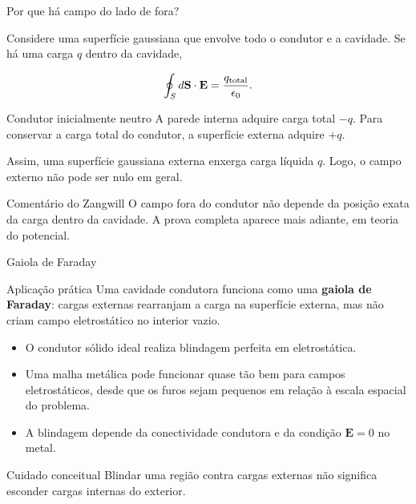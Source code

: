 \documentclass[aspectratio=169]{beamer}
\begin{document}
\begin{frame}{Por que há campo do lado de fora?}

\footnotesize

Considere uma superfície gaussiana que envolve todo o condutor e a cavidade.
Se há uma carga \(q\) dentro da cavidade,

\begin{eqbox}
\begin{equation}
\oint_S d\mathbf S\cdot \mathbf E
=
\frac{q_{\rm total}}{\epsilon_0}.
\label{eq:gauss-carga-cavidade}
\end{equation}
\end{eqbox}

\begin{mybox}{Condutor inicialmente neutro}
A parede interna adquire carga total \(-q\). Para conservar a carga total do
condutor, a superfície externa adquire \(+q\).
\end{mybox}

Assim, uma superfície gaussiana externa enxerga carga líquida \(q\). Logo,
o campo externo não pode ser nulo em geral.

\begin{alertblock}{Comentário do Zangwill}
O campo fora do condutor não depende da posição exata da carga dentro da
cavidade. A prova completa aparece mais adiante, em teoria do potencial.
\end{alertblock}

\end{frame}

\begin{frame}{Gaiola de Faraday}

\small

\begin{mybox}{Aplicação prática}
Uma cavidade condutora funciona como uma \textbf{gaiola de Faraday}: cargas
externas rearranjam a carga na superfície externa, mas não criam campo
eletrostático no interior vazio.
\end{mybox}

\begin{itemize}
\item O condutor sólido ideal realiza blindagem perfeita em eletrostática.
\item Uma malha metálica pode funcionar quase tão bem para campos
eletrostáticos, desde que os furos sejam pequenos em relação à escala espacial
do problema.
\item A blindagem depende da conectividade condutora e da condição
\(\mathbf E=0\) no metal.
\end{itemize}

\begin{alertblock}{Cuidado conceitual}
Blindar uma região contra cargas externas não significa esconder cargas
internas do exterior.
\end{alertblock}

\end{frame}
\end{document}
